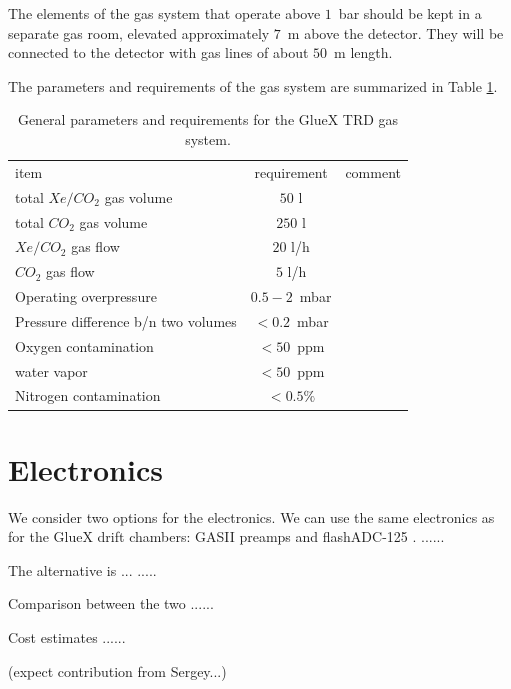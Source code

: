 \documentclass[%
preprint,
nofootinbib,
 amsmath,amssymb,
 aps,
floatfix,
]{revtex4-1}
\begin{document}
The elements of the gas system that operate above $1$~bar should be kept in a separate gas room,
elevated approximately $7$~m above the detector. They will be connected to the detector with
gas lines of about $50$~m length.

The parameters and requirements of the gas system are summarized in Table \ref{tab:gas}.

\begin{table}[h!]
\begin{ruledtabular}
\begin{tabular}{lcc}
\textrm{item}&
\textrm{requirement}&
\textrm{comment}\\
\colrule
total $Xe/CO_2$  gas volume & $50$ l &\\
total $CO_2$ gas volume & $250$ l &\\
$Xe/CO_2$  gas flow & $20$ l/h &\\
$CO_2$ gas flow & $5$ l/h &\\
Operating overpressure & $0.5-2$~mbar &\\
Pressure difference b/n two volumes & $<0.2$~mbar &\\
Oxygen contamination & $<50$~ppm &\\
water vapor & $<50$~ppm &\\
Nitrogen contamination & $<0.5\%$ &\\
\end{tabular}
\end{ruledtabular}
\caption{
General parameters and requirements for the GlueX TRD gas system.
\label{tab:gas}
}
\end{table}

\newpage
\section{Electronics}
We consider two options for the electronics.
We can use the same  electronics as for the GlueX drift chambers:
GASII \cite{GASII} preamps and flashADC-125 \cite{fADC125}.
......

The alternative is ...
.....

Comparison between the two
......

Cost estimates
......

(expect contribution from Sergey...)


\newpage
\end{document}
